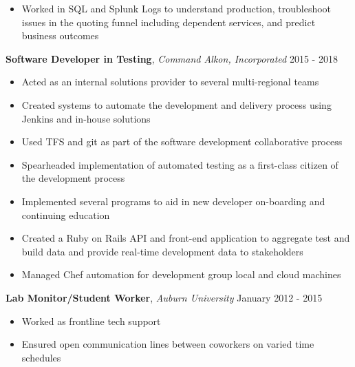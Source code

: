\documentclass[9pt]{article}
\newenvironment{changemargin}[2]{%
  \begin{list}{}{%
      \setlength{\topsep}{0pt}%
      \setlength{\leftmargin}{#1}%
      \setlength{\rightmargin}{#2}%
      \setlength{\listparindent}{\parindent}%
      \setlength{\itemindent}{\parindent}%
      \setlength{\parsep}{\parskip}%
    }%
  \item[]}{\end{list}
}
\newenvironment{body} {
  \vspace*{-16pt}
  \begin{changemargin}{-0.25in}{-0.5in}
  }	
  {\end{changemargin}
}
\begin{document}
\begin{body}
\begin{itemize}
  \item Worked in SQL and Splunk Logs to understand production, troubleshoot issues in the quoting funnel including dependent services, and predict business outcomes
  \end{itemize}
  \vspace{17pt}
  

  \textbf{Software Developer in Testing}, \emph{Command Alkon, Incorporated} \hfill 2015 - 2018 \\
  \vspace*{-4pt}
  \begin{itemize} \itemsep -0pt  %
  \item Acted as an internal solutions provider to several multi-regional teams
  \item Created systems to automate the development and delivery process using Jenkins and in-house solutions
  \item Used TFS and git as part of the software development collaborative process
  \item Spearheaded implementation of automated testing as a first-class citizen of the development process
  \item Implemented several programs to aid in new developer on-boarding and continuing education
  \item Created a Ruby on Rails API and front-end application to aggregate test and build data and provide real-time development data to stakeholders
  \item Managed Chef automation for development group local and cloud machines
  \end{itemize}
  \vspace{17pt}

  \textbf{Lab Monitor/Student Worker}, \emph{Auburn University} \hfill January 2012 - 2015\\
  \vspace*{-4pt}
  \begin{itemize} \itemsep -0pt  %
  \item Worked as frontline tech support
  \item Ensured open communication lines between coworkers on varied time schedules
  \end{itemize}
  \vspace{17pt}
\end{body}

\smallskip

\end{document}
